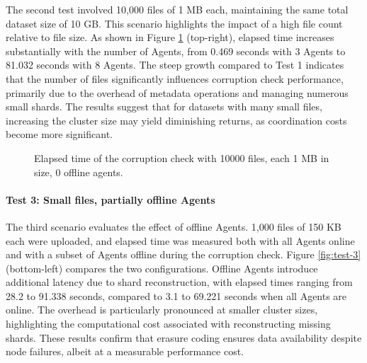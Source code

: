 The second test involved 10,000 files of 1 MB each, maintaining the same total
dataset size of 10 GB. This scenario highlights the impact of a high file count
relative to file size. As shown in Figure \ref{fig:test-2} (top-right), elapsed time increases substantially with the number of Agents, from 0.469 seconds with 3 Agents to 81.032 seconds with 8 Agents. The steep growth compared to Test 1 indicates that the number of files significantly influences corruption check performance, primarily due to the overhead of metadata operations and managing numerous small shards. The results suggest that for datasets with many small files, increasing the cluster size may yield diminishing returns, as coordination costs become more significant.

\begin{figure}[!ht]
\centering
{}
\caption{Elapsed time of the corruption check with 10000 files, each 1 MB in size, 0 offline agents.}
\label{fig:test-2}
\end{figure}

\newpage
\paragraph{Test 3: Small files, partially offline Agents}

The third scenario evaluates the effect of offline Agents. 1,000 files of 150 KB
each were uploaded, and elapsed time was measured both with all Agents online
and with a subset of Agents offline during the corruption check.
Figure \ref{fig:test-3} (bottom-left) compares the two configurations. Offline Agents introduce additional latency due to shard reconstruction, with elapsed times ranging from 28.2 to 91.338 seconds, compared to 3.1 to 69.221 seconds when all Agents are online. The overhead is particularly pronounced at smaller cluster sizes, highlighting the computational cost associated with reconstructing missing shards. These results confirm that erasure coding ensures data availability despite node failures, albeit at a measurable performance cost.

